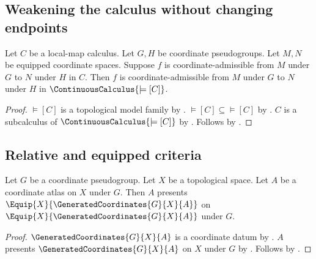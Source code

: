 \subsection{Weakening the calculus without changing endpoints}

\begin{theorem}\label{coordinate_map_continuous_weakening}
    Let $C$ be a local-map calculus.
    Let $G,H$ be coordinate pseudogroups.
    Let $M,N$ be equipped coordinate spaces.
    Suppose $f$ is coordinate-admissible from $M$ under $G$ to $N$ under $H$ in $C$.
    Then $f$ is coordinate-admissible from $M$ under $G$ to $N$ under $H$
        in $\ContinuousCalculus{\models[C]}$.
\end{theorem}
\begin{proof}
    $\models[C]$ is a topological model family by .
    $\models[C]\subseteq\models[C]$ by .
    $C$ is a subcalculus of $\ContinuousCalculus{\models[C]}$ by
        .
    Follows by .
\end{proof}

\subsection{Relative and equipped criteria}

\begin{theorem}\label{imported_generated_equipped_presentation}
    Let $G$ be a coordinate pseudogroup.
    Let $X$ be a topological space.
    Let $A$ be a coordinate atlas on $X$ under $G$.
    Then $A$ presents $\Equip{X}{\GeneratedCoordinates{G}{X}{A}}$
        on $\Equip{X}{\GeneratedCoordinates{G}{X}{A}}$ under $G$.
\end{theorem}
\begin{proof}
    $\GeneratedCoordinates{G}{X}{A}$ is a coordinate datum by
        .
    $A$ presents $\GeneratedCoordinates{G}{X}{A}$ on $X$ under $G$ by
        .
    Follows by .
\end{proof}

